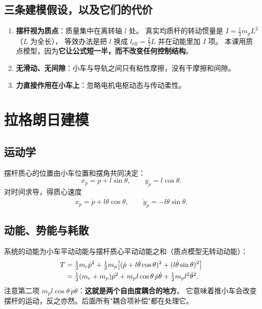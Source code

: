 \subsection{三条建模假设，以及它们的代价}

\begin{enumerate}[leftmargin=2em,itemsep=2pt]
  \item \textbf{摆杆视为质点}：质量集中在离转轴 $l$ 处。
        真实均质杆的转动惯量是 $I=\tfrac13 m_p L^2$（$L$ 为全长），
        等效办法是把 $l$ 换成 $l_{\mathrm{eff}}=\tfrac{2}{3}L$ 并在动能里加 $I$ 项。
        本课用质点模型，因为\textbf{它让公式短一半，而不改变任何控制结构}。
  \item \textbf{无滑动、无间隙}：小车与导轨之间只有粘性摩擦，没有干摩擦和间隙。
  \item \textbf{力直接作用在小车上}：忽略电机电枢动态与传动柔性。
\end{enumerate}


\section{拉格朗日建模}

\subsection{运动学}

摆杆质心的位置由小车位置和摆角共同决定：
\begin{equation}
  x_p = p + l\sin\theta,\qquad y_p = l\cos\theta .
  \label{eq:kin}
\end{equation}
对时间求导，得质心速度
\begin{equation}
  \dot x_p = \dot p + l\dot\theta\cos\theta,\qquad
  \dot y_p = -l\dot\theta\sin\theta .
  \label{eq:vel}
\end{equation}

\subsection{动能、势能与耗散}

系统的动能为小车平动动能与摆杆质心平动动能之和（质点模型无转动动能）：
\begin{align}
  T &= \tfrac12 m_c \dot p^2
     + \tfrac12 m_p\big[(\dot p + l\dot\theta\cos\theta)^2
                      + (l\dot\theta\sin\theta)^2\big] \notag\\
    &= \tfrac12(m_c+m_p)\dot p^2 + m_p l\cos\theta\,\dot p\dot\theta
     + \tfrac12 m_p l^2 \dot\theta^2 .
  \label{eq:T}
\end{align}
注意第二项 $m_p l\cos\theta\,\dot p\dot\theta$：\textbf{这就是两个自由度耦合的地方}。
它意味着推小车会改变摆杆的运动，反之亦然。后面所有"耦合项补偿"都在处理它。

